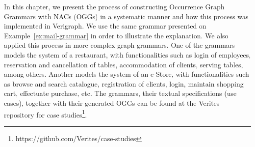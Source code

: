 In this chapter, we present the process of constructing Occurrence Graph Grammars with NACs (OGGs) in a systematic manner and how this process was implemented in Verigraph. We use the same grammar presented on Example~\ref{ex:mail-grammar} in order to illustrate the explanation. We also applied this process in more complex graph grammars. One of the grammars models the system of a restaurant, with functionalities such as login of employees, reservation and cancellation of tables,
accommodation of clients, serving tables, among others. Another models the system of an e-Store, with functionalities such as browse and search catalogue, registration of clients, login, maintain shopping cart, effectuate purchase, etc. The grammars, their textual specifications (use cases), together with their generated OGGs can be found at the Verites repository for case studies\footnote{https://github.com/Verites/case-studies}.



